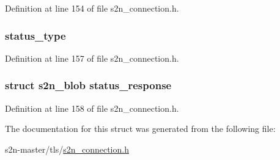 Definition at line 154 of file s2n\+\_\+connection.\+h.

\subsubsection[{\texorpdfstring{status\+\_\+type}{status_type}}]{ status\+\_\+type}\hypertarget{structs2n__connection_a0dd734711814c74b9bb3d920187cfe3a}{}\label{structs2n__connection_a0dd734711814c74b9bb3d920187cfe3a}


Definition at line 157 of file s2n\+\_\+connection.\+h.

\subsubsection[{\texorpdfstring{status\+\_\+response}{status_response}}]{\setlength{\rightskip}{0pt plus 5cm}struct {\bf s2n\+\_\+blob} status\+\_\+response}\hypertarget{structs2n__connection_ab3cd78ec62aea98bf900913bb379d523}{}\label{structs2n__connection_ab3cd78ec62aea98bf900913bb379d523}


Definition at line 158 of file s2n\+\_\+connection.\+h.



The documentation for this struct was generated from the following file\+:\begin{DoxyCompactItemize}
\item 
s2n-\/master/tls/\hyperlink{s2n__connection_8h}{s2n\+\_\+connection.\+h}\end{DoxyCompactItemize}
